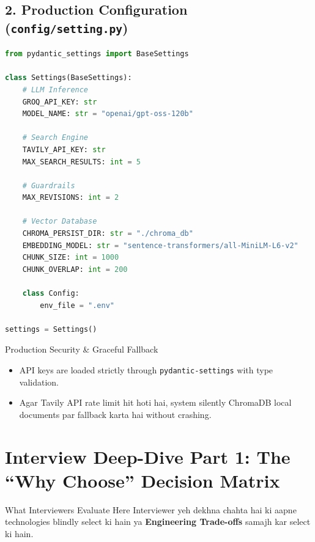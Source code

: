 \documentclass[9.5pt, a4paper]{article}
\begin{document}
\vspace{-4pt}
\subsection{2. Production Configuration (\texttt{config/setting.py})}

\begin{lstlisting}[language=Python]
from pydantic_settings import BaseSettings

class Settings(BaseSettings):
    # LLM Inference
    GROQ_API_KEY: str
    MODEL_NAME: str = "openai/gpt-oss-120b"
    
    # Search Engine
    TAVILY_API_KEY: str
    MAX_SEARCH_RESULTS: int = 5
    
    # Guardrails
    MAX_REVISIONS: int = 2
    
    # Vector Database
    CHROMA_PERSIST_DIR: str = "./chroma_db"
    EMBEDDING_MODEL: str = "sentence-transformers/all-MiniLM-L6-v2"
    CHUNK_SIZE: int = 1000
    CHUNK_OVERLAP: int = 200

    class Config:
        env_file = ".env"

settings = Settings()
\end{lstlisting}

\begin{warningbox}{Production Security \& Graceful Fallback}
\begin{itemize}
    \item API keys are loaded strictly through \texttt{pydantic-settings} with type validation.
    \item Agar Tavily API rate limit hit hoti hai, system silently ChromaDB local documents par fallback karta hai without crashing.
\end{itemize}
\end{warningbox}

\clearpage
\section{Interview Deep-Dive Part 1: The ``Why Choose'' Decision Matrix}

\begin{conceptbox}{What Interviewers Evaluate Here}
Interviewer yeh dekhna chahta hai ki aapne technologies blindly select ki hain ya \textbf{Engineering Trade-offs} samajh kar select ki hain.
\end{conceptbox}
\end{document}
